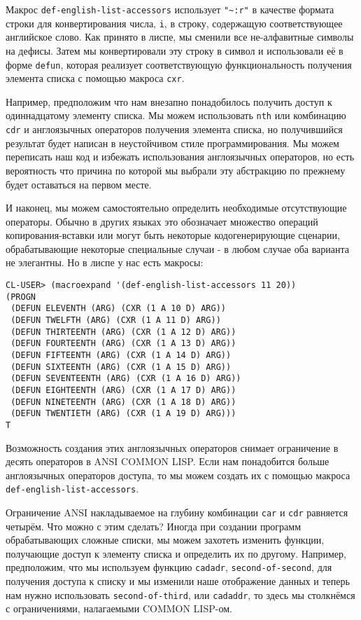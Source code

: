 Макрос \verb"def-english-list-accessors" использует \verb|"~:r"| в качестве формата строки для конвертирования числа, \verb|i|, в строку, содержащую соответствующее английское слово. Как принято в лиспе, мы сменили все не-алфавитные символы на дефисы. Затем мы конвертировали эту строку в символ и использовали её в форме \verb|defun|, которая реализует соответствующую функциональность получения элемента списка с помощью макроса \verb|cxr|.

Например, предположим что нам внезапно понадобилось получить доступ к одиннадцатому элементу списка. Мы можем использовать \verb|nth| или комбинацию \verb|cdr| и англоязычных операторов получения элемента списка, но получившийся результат будет написан в неустойчивом стиле программирования. Мы можем переписать наш код и избежать использования англоязычных операторов, но есть вероятность что причина по которой мы выбрали эту абстракцию по прежнему будет оставаться на первом месте.

И наконец, мы можем самостоятельно определить необходимые отсутствующие операторы. Обычно в других языках это обозначает множество операций копирования-вставки или могут быть некоторые кодогенерирующие сценарии, обрабатывающие некоторые специальные случаи - в любом случае оба варианта не элегантны. Но в лиспе у нас есть макросы:

\begin{verbatim}
CL-USER> (macroexpand '(def-english-list-accessors 11 20))
(PROGN
 (DEFUN ELEVENTH (ARG) (CXR (1 A 10 D) ARG))
 (DEFUN TWELFTH (ARG) (CXR (1 A 11 D) ARG))
 (DEFUN THIRTEENTH (ARG) (CXR (1 A 12 D) ARG))
 (DEFUN FOURTEENTH (ARG) (CXR (1 A 13 D) ARG))
 (DEFUN FIFTEENTH (ARG) (CXR (1 A 14 D) ARG))
 (DEFUN SIXTEENTH (ARG) (CXR (1 A 15 D) ARG))
 (DEFUN SEVENTEENTH (ARG) (CXR (1 A 16 D) ARG))
 (DEFUN EIGHTEENTH (ARG) (CXR (1 A 17 D) ARG))
 (DEFUN NINETEENTH (ARG) (CXR (1 A 18 D) ARG))
 (DEFUN TWENTIETH (ARG) (CXR (1 A 19 D) ARG)))
T
\end{verbatim}

Возможность создания этих англоязычных операторов снимает ограничение в десять операторов в ANSI COMMON LISP. Если нам понадобится больше англоязычных операторов доступа, то мы можем создать их с помощью макроса \verb|def-english-list-accessors|.

Ограничение ANSI накладываемое на глубину комбинации \verb|car| и \verb|cdr| равняется четырём. Что можно с этим сделать? Иногда при создании программ обрабатывающих сложные списки, мы можем захотеть изменить функции, получающие доступ к элементу списка и определить их по другому. Например, предположим, что мы используем функцию \verb|cadadr|, \verb|second-of-second|, для получения доступа к списку и мы изменили наше отображение данных и теперь нам нужно использовать \verb|second-of-third|, или \verb|cadaddr|, то здесь мы столкнёмся с ограничениями, налагаемыми COMMON LISP-ом.

